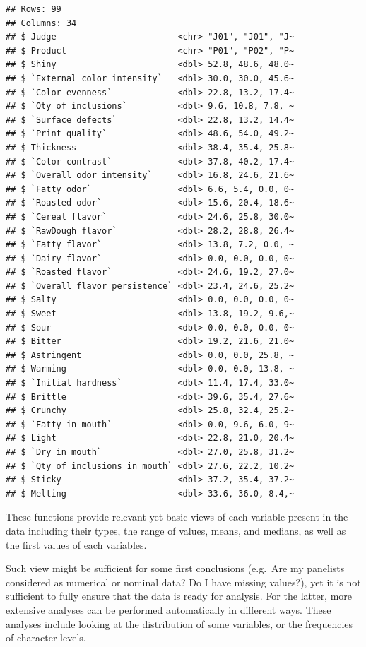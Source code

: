 \documentclass[
]{krantz}
\begin{document}
\begin{verbatim}
## Rows: 99
## Columns: 34
## $ Judge                        <chr> "J01", "J01", "J~
## $ Product                      <chr> "P01", "P02", "P~
## $ Shiny                        <dbl> 52.8, 48.6, 48.0~
## $ `External color intensity`   <dbl> 30.0, 30.0, 45.6~
## $ `Color evenness`             <dbl> 22.8, 13.2, 17.4~
## $ `Qty of inclusions`          <dbl> 9.6, 10.8, 7.8, ~
## $ `Surface defects`            <dbl> 22.8, 13.2, 14.4~
## $ `Print quality`              <dbl> 48.6, 54.0, 49.2~
## $ Thickness                    <dbl> 38.4, 35.4, 25.8~
## $ `Color contrast`             <dbl> 37.8, 40.2, 17.4~
## $ `Overall odor intensity`     <dbl> 16.8, 24.6, 21.6~
## $ `Fatty odor`                 <dbl> 6.6, 5.4, 0.0, 0~
## $ `Roasted odor`               <dbl> 15.6, 20.4, 18.6~
## $ `Cereal flavor`              <dbl> 24.6, 25.8, 30.0~
## $ `RawDough flavor`            <dbl> 28.2, 28.8, 26.4~
## $ `Fatty flavor`               <dbl> 13.8, 7.2, 0.0, ~
## $ `Dairy flavor`               <dbl> 0.0, 0.0, 0.0, 0~
## $ `Roasted flavor`             <dbl> 24.6, 19.2, 27.0~
## $ `Overall flavor persistence` <dbl> 23.4, 24.6, 25.2~
## $ Salty                        <dbl> 0.0, 0.0, 0.0, 0~
## $ Sweet                        <dbl> 13.8, 19.2, 9.6,~
## $ Sour                         <dbl> 0.0, 0.0, 0.0, 0~
## $ Bitter                       <dbl> 19.2, 21.6, 21.0~
## $ Astringent                   <dbl> 0.0, 0.0, 25.8, ~
## $ Warming                      <dbl> 0.0, 0.0, 13.8, ~
## $ `Initial hardness`           <dbl> 11.4, 17.4, 33.0~
## $ Brittle                      <dbl> 39.6, 35.4, 27.6~
## $ Crunchy                      <dbl> 25.8, 32.4, 25.2~
## $ `Fatty in mouth`             <dbl> 0.0, 9.6, 6.0, 9~
## $ Light                        <dbl> 22.8, 21.0, 20.4~
## $ `Dry in mouth`               <dbl> 27.0, 25.8, 31.2~
## $ `Qty of inclusions in mouth` <dbl> 27.6, 22.2, 10.2~
## $ Sticky                       <dbl> 37.2, 35.4, 37.2~
## $ Melting                      <dbl> 33.6, 36.0, 8.4,~
\end{verbatim}

These functions provide relevant yet basic views of each variable present in the data including their types, the range of values, means, and medians, as well as the first values of each variables.

Such view might be sufficient for some first conclusions (e.g.~Are my panelists considered as numerical or nominal data? Do I have missing values?), yet it is not sufficient to fully ensure that the data is ready for analysis. For the latter, more extensive analyses can be performed automatically in different ways. These analyses include looking at the distribution of some variables, or the frequencies of character levels.
\end{document}
